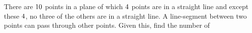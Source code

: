 



\gcalcexpr[0]\tmp{\vbone - \vbtwo}

\question There are $10$ points in a plane of which $4$ points are in a straight line 
and except these $4$, no three of the others are in a straight line. A line-segment between two points
can pass through other points. Given this, find the number of

\watchout

\ifprintanswers
\fi 


